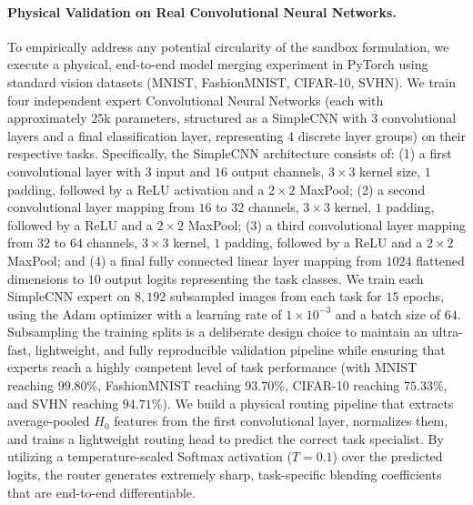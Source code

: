 \paragraph{Physical Validation on Real Convolutional Neural Networks.}
To empirically address any potential circularity of the sandbox formulation, we execute a physical, end-to-end model merging experiment in PyTorch using standard vision datasets (MNIST, FashionMNIST, CIFAR-10, SVHN). We train four independent expert Convolutional Neural Networks (each with approximately $25$k parameters, structured as a SimpleCNN with 3 convolutional layers and a final classification layer, representing 4 discrete layer groups) on their respective tasks. Specifically, the SimpleCNN architecture consists of: (1) a first convolutional layer with $3$ input and $16$ output channels, $3\times 3$ kernel size, $1$ padding, followed by a ReLU activation and a $2\times 2$ MaxPool; (2) a second convolutional layer mapping from $16$ to $32$ channels, $3\times 3$ kernel, $1$ padding, followed by a ReLU and a $2\times 2$ MaxPool; (3) a third convolutional layer mapping from $32$ to $64$ channels, $3\times 3$ kernel, $1$ padding, followed by a ReLU and a $2\times 2$ MaxPool; and (4) a final fully connected linear layer mapping from $1024$ flattened dimensions to $10$ output logits representing the task classes. We train each SimpleCNN expert on $8,192$ subsampled images from each task for $15$ epochs, using the Adam optimizer with a learning rate of $1\times 10^{-3}$ and a batch size of $64$. Subsampling the training splits is a deliberate design choice to maintain an ultra-fast, lightweight, and fully reproducible validation pipeline while ensuring that experts reach a highly competent level of task performance (with MNIST reaching $99.80\%$, FashionMNIST reaching $93.70\%$, CIFAR-10 reaching $75.33\%$, and SVHN reaching $94.71\%$). We build a physical routing pipeline that extracts average-pooled $H_0$ features from the first convolutional layer, normalizes them, and trains a lightweight routing head to predict the correct task specialist. By utilizing a temperature-scaled Softmax activation ($T=0.1$) over the predicted logits, the router generates extremely sharp, task-specific blending coefficients that are end-to-end differentiable.

